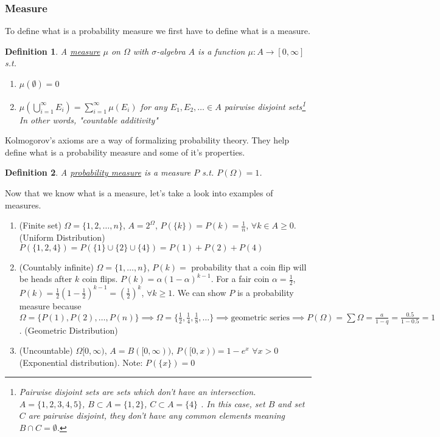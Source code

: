 \documentclass{article}
\newtheorem{definition}{Definition}
\begin{document}
\subsubsection{Measure}
To define what is a probability measure we first have to define what is a measure.
\begin{definition}
    \label{def:measure}
    A \underline{measure} $\mu$ on $\Omega$ with $\sigma$-algebra  $A$ is a function  $\mu : A \to [0, \infty]$ s.t.
    \begin{enumerate}
    \item $\mu( \emptyset ) = 0$
    \item $\mu ( \bigcup_{i=1}^{\infty} E_i) = \sum_{i=1}^{\infty} \mu(E_i)$ for any 
        $E_1, E_2, \dots \in A$ pairwise disjoint sets\footnote{Pairwise disjoint sets are sets which don't have an intersection. $A = \{1, 2, 3, 4, 5\}$, $B \subset A = \{ 1, 2\}$, $ C \subset A = \{ 4 \} $ . In this case, set $B$ and set $C$ are pairwise disjoint, they don't have any common elements meaning $B \cap C = \emptyset$. }
        In other words, "countable additivity"
        
    \end{enumerate}
\end{definition}
Kolmogorov's axioms are a way of formalizing probability theory. They help define what 
is a probability measure and some of it's properties. 
\begin{definition}
    \label{def:probability-measure}
    A \underline{probability measure} is a measure $P$ s.t.  $P(\Omega) = 1$.
\end{definition}
Now that we know what is a measure, let's take a look into examples of measures.
\begin{enumerate}
    \item (Finite set) $\Omega = \{ 1, 2, \dots, n\}$, $A = 2^\Omega$, 
        $P(\{k\}) = P(k) = \frac{1}{n}$, $\forall k \in A \ge 0$. (Uniform Distribution)
        $P(\{ 1, 2, 4\}) = P(\{1\} \cup \{2\} \cup \{ 4\}) = P(1) + P(2) + P(4)$
    \item (Countably infinite) $\Omega = \{1, \dots, n\}$, $P(k) = $ 
        probability that a coin flip will be heads after $k$ coin flips. 
        $P(k) = \alpha (1-\alpha)^{k-1}$. For a fair coin 
        $\alpha = \frac{1}{2}$, $P(k) = \frac{1}{2}(1-\frac{1}{2})^{k-1} = (\frac{1}{2})^k$,
        $\forall k \ge 1$. We can show $P$ is a probability measure because 
        $\Omega = \{P(1), P(2), \dots, P(n) \} \implies
        \Omega = \{ \frac{1}{2}, \frac{1}{4}, \frac{1}{8}, \dots \} \implies 
        \text{geometric series} \implies 
        P(\Omega) = \sum \Omega = \frac{a}{1-q} = \frac{0.5}{1-0.5} = 1$. 
        (Geometric Distribution) 
    \item (Uncountable) $\Omega [0, \infty)$, 
        $A = B([0, \infty))$, $P([0, x)) = 1-e^x$  $\forall x > 0$ 
        (Exponential distribution). Note:  $P(\{x\}) = 0$
\end{enumerate}
\end{document}
